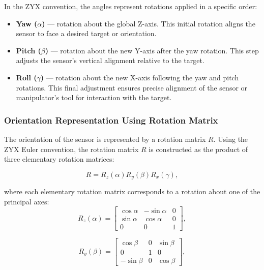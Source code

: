\documentclass[12pt]{article}
\begin{document}
\vspace{0.5cm}

In the ZYX convention, the angles represent rotations applied in a specific order:
\begin{itemize}
    \item \textbf{Yaw (\(\alpha\))} — rotation about the global Z-axis. This initial rotation aligns the sensor to face a desired target or orientation.
    \item \textbf{Pitch (\(\beta\))} — rotation about the new Y-axis after the yaw rotation. This step adjusts the sensor's vertical alignment relative to the target.
    \item \textbf{Roll (\(\gamma\))} — rotation about the new X-axis following the yaw and pitch rotations. This final adjustment ensures precise alignment of the sensor or manipulator's tool for interaction with the target.
\end{itemize}

\subsubsection{Orientation Representation Using Rotation Matrix}

The orientation of the sensor is represented by a rotation matrix \(R\). Using the ZYX Euler convention, the rotation matrix \(R\) is constructed as the product of three elementary rotation matrices:

\begin{equation}
\label{eq:R_combined_task4}
R = R_z(\alpha) R_y(\beta) R_x(\gamma),
\end{equation}

where each elementary rotation matrix corresponds to a rotation about one of the principal axes:
\begin{equation}
\label{eq:Rz}
R_z(\alpha) =
\begin{bmatrix}
\cos\alpha & -\sin\alpha & 0 \\
\sin\alpha & \cos\alpha & 0 \\
0 & 0 & 1
\end{bmatrix},
\end{equation}

\begin{equation}
\label{eq:Ry}
R_y(\beta) =
\begin{bmatrix}
\cos\beta & 0 & \sin\beta \\
0 & 1 & 0 \\
-\sin\beta & 0 & \cos\beta
\end{bmatrix}, 
\end{equation}
\end{document}
